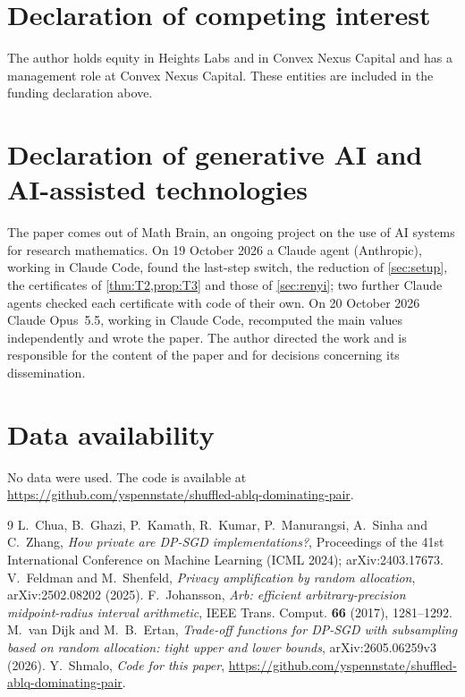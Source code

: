 \documentclass[11pt]{amsart}
\theoremstyle{definition}
\theoremstyle{remark}
\begin{document}
\section*{Declaration of competing interest}
The author holds equity in Heights Labs and in Convex Nexus Capital and
has a management role at Convex Nexus Capital. These entities are included
in the funding declaration above.

\section*{Declaration of generative AI and AI-assisted technologies}
The paper comes out of Math Brain, an ongoing project on the use of AI systems for research mathematics. On 19 October 2026 a Claude agent (Anthropic), working in Claude Code, found the last-step switch, the reduction of \cref{sec:setup}, the certificates of \cref{thm:T2,prop:T3} and those of \cref{sec:renyi}; two further Claude agents checked each certificate with code of their own. On 20 October 2026 Claude Opus~5.5, working in Claude Code, recomputed the main values independently and wrote the paper. The author directed the work and is responsible for the content of the paper and for decisions concerning its dissemination.

\section*{Data availability}
No data were used. The code is available at\\ \url{https://github.com/yspennstate/shuffled-ablq-dominating-pair}.

\begin{thebibliography}{9}
 L.~Chua, B.~Ghazi, P.~Kamath, R.~Kumar, P.~Manurangsi, A.~Sinha and C.~Zhang, \emph{How private are DP-SGD implementations?}, Proceedings of the 41st International Conference on Machine Learning (ICML 2024); arXiv:2403.17673.
 V.~Feldman and M.~Shenfeld, \emph{Privacy amplification by random allocation}, arXiv:2502.08202 (2025).
 F.~Johansson, \emph{Arb: efficient arbitrary-precision midpoint-radius interval arithmetic}, IEEE Trans. Comput. \textbf{66} (2017), 1281--1292.
 M.~van Dijk and M.~B.~Ertan, \emph{Trade-off functions for DP-SGD with subsampling based on random allocation: tight upper and lower bounds}, arXiv:2605.06259v3 (2026).
 Y.~Shmalo, \emph{Code for this paper}, \url{https://github.com/yspennstate/shuffled-ablq-dominating-pair}.
\end{thebibliography}
\end{document}
